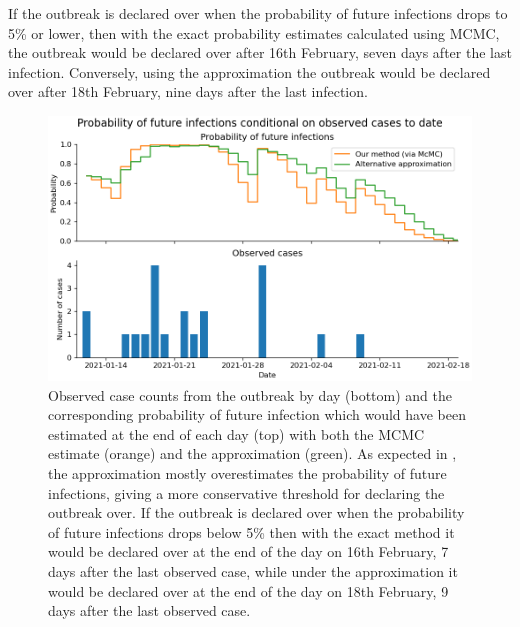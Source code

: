 \documentclass{article}
\begin{document}
If the outbreak is declared over when the probability of future infections drops to 5\% or lower, then with the exact probability estimates calculated using MCMC, the outbreak would be declared over after 16th February, seven days after the last infection. Conversely, using the approximation the outbreak would be declared over after 18th February, nine days after the last infection.

\begin{figure}[p]
\includegraphics[width=\textwidth]{taiwan-eoo-plot.png}
\centering
\caption{Observed case counts from the outbreak by day (bottom) and the corresponding probability of future infection which would have been estimated at the end of each day (top) with both the MCMC estimate (orange) and the approximation (green). As expected in \cite{Nishiura2016}, the approximation mostly overestimates the probability of future infections, giving a more conservative threshold for declaring the outbreak over. If the outbreak is declared over when the probability of future infections drops below 5\% then with the exact method it would be declared over at the end of the day on 16th February, 7 days after the last observed case, while under the approximation it would be declared over at the end of the day on 18th February, 9 days after the last observed case.}
\label{fig:eoo-probabilities}
\end{figure}
\end{document}
